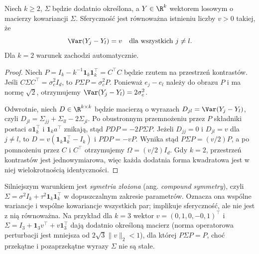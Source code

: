 \begin{twierdzenie}\label{thm:sphericity-differences}
Niech $k\ge2$, $\Sigma$ będzie dodatnio określona, a $Y\in\R^k$ wektorem losowym o macierzy kowariancji $\Sigma$. Sferyczność jest równoważna istnieniu liczby $v>0$ takiej, że
\[
 \Var(Y_j-Y_l)=v\quad\text{dla wszystkich }j\ne l.
\]
Dla $k=2$ warunek zachodzi automatycznie.
\end{twierdzenie}
\begin{proof}
Niech $P=I_k-k^{-1}\mathbf1_k\mathbf1_k^\top=C^\top C$ będzie rzutem na przestrzeń kontrastów. Jeśli $C\Sigma C^\top=\sigma_c^2 I_d$, to $P\Sigma P=\sigma_c^2P$. Ponieważ $e_j-e_l$ należy do obrazu $P$ i ma normę $\sqrt2$, otrzymujemy $\Var(Y_j-Y_l)=2\sigma_c^2$.

Odwrotnie, niech $D\in\R^{k\times k}$ będzie macierzą o wyrazach $D_{jl}=\Var(Y_j-Y_l)$, czyli $D_{jl}=\Sigma_{jj}+\Sigma_{ll}-2\Sigma_{jl}$. Po obustronnym przemnożeniu przez $P$ składniki postaci $a\mathbf1_k^\top$ i $\mathbf1_k a^\top$ znikają, stąd $PDP=-2P\Sigma P$. Jeżeli $D_{jj}=0$ i $D_{jl}=v$ dla $j\ne l$, to $D=v(\mathbf1_k\mathbf1_k^\top-I_k)$ i $PDP=-vP$. Wynika stąd $P\Sigma P=(v/2)P$, a po pomnożeniu przez $C$ i $C^\top$ otrzymujemy $\Omega=(v/2)I_d$. Gdy $k=2$, przestrzeń kontrastów jest jednowymiarowa, więc każda dodatnia forma kwadratowa jest w niej wielokrotnością identyczności.
\end{proof}

\begin{uwaga}
Silniejszym warunkiem jest \emph{symetria złożona} (ang. \emph{compound symmetry}), czyli $\Sigma=\sigma^2I_k+\tau^2\mathbf1_k\mathbf1_k^\top$ w dopuszczalnym zakresie parametrów. Oznacza ona wspólne wariancje i wspólne kowariancje wszystkich par; implikuje sferyczność, ale nie jest z nią równoważna. Na przykład dla $k=3$ wektor $v=(0{,}1,0,-0{,}1)^\top$ i $\Sigma=I_3+\mathbf1_3v^\top+v\mathbf1_3^\top$ dają dodatnio określoną macierz (norma operatorowa perturbacji jest mniejsza od $2\sqrt3\|v\|_2<1$), dla której $P\Sigma P=P$, choć przekątne i pozaprzekątne wyrazy $\Sigma$ nie są stałe.
\end{uwaga}

